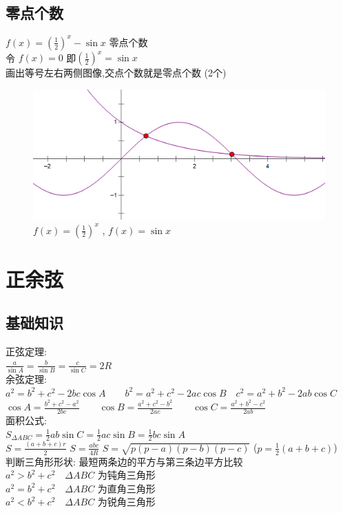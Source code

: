 \documentclass[hyperref, UTF8,11pt,a4paper]{ctexart} %
\begin{document}
\subsection {零点个数}
{\color{red}  $f(x)=\left(\frac{1}{2}\right)^{x}-\sin x$ 零点个数} \\
令 $f(x)=0$ 即$\left(\frac{1}{2}\right)^{x}=\sin x$ \\
画出等号左右两侧图像,交点个数就是零点个数 (2个)
\begin{figure}[h] %
	\begin{center}
		\includegraphics[scale=0.5]  {pic/sanjiaohanshu/lingdiangeshu.png}
		\caption{$f(x)=\left(\frac{1}{2}\right)^{x}$ , $f(x)=\sin x$}
	\end{center}
\end{figure}

\newpage
\section{正余弦}
\subsection{基础知识}
{\color{blue} 正弦定理: } \\ $\frac{a}{\sin A}=\frac{b}{\sin B}=\frac{c}{\sin C}=2 R$ \\
{\color{blue}余弦定理: }\\ $a^{2}=b^{2}+c^{2}-2 b c \cos A \qquad b^{2}=a^{2}+c^{2}-2 a c \cos B \quad c^{2}=a^{2}+b^{2}-2 a b \cos C$ \\
\qquad \qquad $\cos A=\frac{b^{2}+c^{2}-a^{2}}{2 b c} \qquad \cos B=\frac{a^{2}+c^{2}-b^{2}}{2 a c} \qquad \cos C=\frac{a^{2}+b^{2}-c^{2}}{2 a b}$ \\
{\color{blue}面积公式:} \\
$S_{\Delta A B C}=\frac{1}{2} a b \sin C=\frac{1}{2} a c \sin B=\frac{1}{2} b c \sin A$ \\
$S=\frac{(a+b+c) r}{2}$ \qquad
$S=\frac{abc}{4R}$ \qquad $S=\sqrt{p(p-a)(p-b)(p-c)}$ \qquad ($p=\frac{1}{2}(a+b+c)$) \\
{\color{blue}判断三角形形状:}
最短两条边的平方与第三条边平方比较 \\
$a^{2}>b^{2}+c^{2} \quad \Delta A B C$ 为钝角三角形 \\
$a^{2}=b^{2}+c^{2} \quad \Delta A B C$ 为直角三角形 \\
$a^{2}<b^{2}+c^{2} \quad \Delta A B C$ 为锐角三角形 \\
\end{document}
